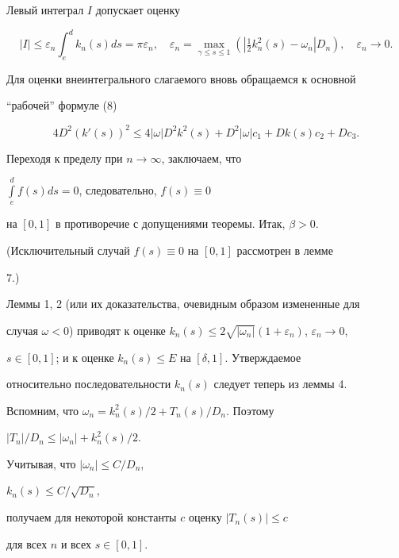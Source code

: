 Левый интеграл $I$ допускает оценку


$$


| I |\le \varepsilon_n\int_e^d k_n(s)ds=\pi \varepsilon_n,\quad


\varepsilon_n=\max_{\gamma \le s \le 1}


(| \tfrac{1}{2}k_n^2(s)-\omega_n|D_n), \quad \varepsilon_n\to 0.


$$





Для оценки внеинтегрального слагаемого вновь обращаемся к основной


``рабочей'' формуле (8)


$$


4D^2({k'(s)})^2\le 4| \omega |D^2k^2(s)+


D^2| \omega |c_1+Dk(s)c_2+Dc_3.


$$


Переходя к пределу при $n\to \infty $, заключаем, что


$\int\limits_e^d f(s)ds=0$, следовательно, $f(s) \equiv 0$


на $[0,1]$ в противоречие с допущениями теоремы. Итак, $\beta >0$.


(Исключительный случай $f(s) \equiv 0$ на $[0,1]$ рассмотрен в лемме


7.)





Леммы 1, 2 (или их доказательства, очевидным образом измененные для


случая $\omega <0$) приводят к оценке $k_n(s)\le 2\sqrt {| {\omega


_n}|}({1+\varepsilon_n})$, $\varepsilon_n\to 0$,


$s \in [0,1]$; и к оценке $k_n(s) \le E$ на $[\delta ,1]$. Утверждаемое


относительно последовательности $k_n(s)$ следует теперь из леммы 4.





Вспомним, что $\omega_n=k_n^2(s)/2 +T_n(s)/D_n$. Поэтому


$| T_n|/{D_n}\le| {\omega_n}|+k_n^2(s)/2$.


Учитывая, что $| {\omega_n} |\le C/D_n$,


$k_n(s)\le C/\sqrt {D_n},$


получаем для некоторой константы $c$ оценку $| {T_n(s)}|\le c$


для всех $n$ и всех $s \in [0,1]$.






